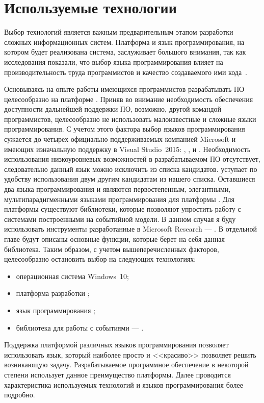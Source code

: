 \chapter{Используемые технологии}
\label{sec:practice:technology_used}

Выбор технологий является важным предварительным этапом разработки сложных информационных систем.
Платформа и язык программирования, на котором будет реализована система, заслуживает большого внимания, так как исследования показали, что выбор языка программирования влияет на производительность труда программистов и качество создаваемого ими кода~\cite[c.~59]{mcconnell_2005}.

Основываясь на опыте работы имеющихся программистов разрабатывать ПО целесообразно на платформе \dotnet{}.
Приняв во внимание необходимость обеспечения доступности дальнейшей поддержки ПО, возможно, другой командой программистов, целесообразно не использовать малоизвестные и сложные языки программирования.
С учетом этого фактора выбор языков программирования сужается до четырех официально поддерживаемых компанией Microsoft и имеющих изначальную поддержку в Visual Studio~2015: \cppcli{}, \csharp{}, \vbnet{} и \fsharp{}.
Необходимость использования низкоуровневых возможностей \cppcli{} в разрабатываемом ПО отсутствует, следовательно данный язык можно исключить из списка кандидатов.
\vbnet{} уступает по удобству использования двум другим кандидатам из нашего списка.
Оставшиеся два языка программирования \csharp{} и \fsharp{} являются первостепенным, элегантными, мультипарадигменными языками программирования для платформы \dotnet.
Для платформы \dotnet{} существуют библиотеки, которые позволяют упростить работу с системами построенными на событийной модели.
В данном случая я буду использовать инструменты разработанные в Microsoft Research --- \rx{}. В отдельной главе будут описаны основные функции, которые берет на себя данная библиотека.
Таким образом, с учетом вышеперечисленных факторов, целесообразно остановить выбор на следующих технологиях:
\begin{itemize}
  \item операционная система Windows~10;
  \item платформа разработки \dotnet{};
  \item язык программирования \csharp{};
  \item библиотека для работы с событиями --- \rx{}.
\end{itemize}
Поддержка платформой \dotnet{} различных языков программирования позволяет использовать язык, который наиболее просто и <<красиво>> позволяет решить возникающую задачу.
Разрабатываемое программное обеспечение в некоторой степени использует данное преимущество платформы.
Далее проводится характеристика используемых технологий и языков программирования более подробно.

